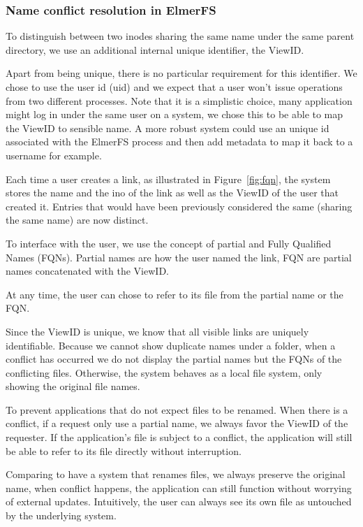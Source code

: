 \documentclass[sigconf, 10pt]{acmart}
\begin{document}
\subsubsection{Name conflict resolution in ElmerFS}

To distinguish between two inodes sharing the same name under the same parent directory, we use an additional internal unique identifier, the ViewID.

Apart from being unique, there is no particular requirement for this identifier.
We chose to use the user id (uid) and we expect that a user won’t issue operations
from two different processes. Note that it is a simplistic choice, many application might
log in under the same user on a system, we chose this to be able to map the ViewID to
sensible name. A more robust system could use an unique id associated with the ElmerFS process and then add metadata
to map it back to a username for example.

Each time a user creates a link, as illustrated in Figure~\ref{fig:fqn},
the system stores the name and the ino of the link as well as the ViewID of the user that created it.
Entries that would have been previously considered the same (sharing the same name) are now distinct.

To interface with the user, we use the concept of partial and Fully Qualified Names (FQNs).
Partial names are how the user named the link, FQN are partial names concatenated with the ViewID.

At any time, the user can chose to refer to its file from the partial name or the FQN.

Since the ViewID is unique, we know that all visible links are uniquely identifiable.
Because we cannot show duplicate names under a folder, when a conflict has occurred we do not display the partial names
but the FQNs of the conflicting files. Otherwise, the system behaves as a local file system, only showing the original file names.

To prevent applications that do not expect files to be renamed. When there is a conflict, if a request only use a partial name, we always favor the ViewID of the requester. If the application's file is subject to a conflict, the application will
still be able to refer to its file directly without interruption.

Comparing to have a system that renames files, we always preserve the original name, when conflict happens, the application can still function without worrying of external updates. Intuitively, the user can always see its own file as untouched by the underlying system.
\end{document}
